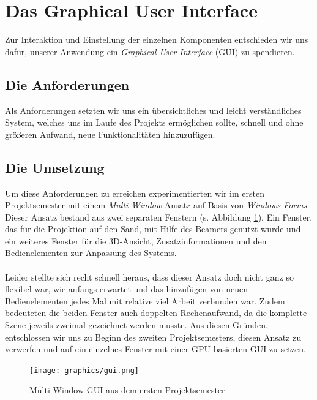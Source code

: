 \section{Das Graphical User Interface} \label{GUISec}
\begin{Spacing}{\mylinespace}

Zur Interaktion und Einstellung der einzelnen Komponenten entschieden wir uns dafür, unserer Anwendung ein \textit{Graphical User Interface} (GUI) zu spendieren. 

\subsection{Die Anforderungen}

Als Anforderungen setzten wir uns ein übersichtliches und leicht verständliches System, welches uns im Laufe des Projekts ermöglichen sollte, schnell und ohne größeren Aufwand, neue Funktionalitäten hinzuzufügen.  

\subsection{Die Umsetzung}

Um diese Anforderungen zu erreichen experimentierten wir im ersten Projektsemester mit einem \textit{Multi-Window} Ansatz auf Basis von \textit{Windows Forms}. Dieser Ansatz bestand aus zwei separaten Fenstern (s. Abbildung \ref{fig:GUIOld}). Ein Fenster, das für die Projektion auf den Sand, mit Hilfe des Beamers genutzt wurde und ein weiteres Fenster für die 3D-Ansicht, Zusatzinformationen und den Bedienelementen zur Anpassung des Systems.
\\\\
Leider stellte sich recht schnell heraus, dass dieser Ansatz doch nicht ganz so flexibel war, wie anfangs erwartet und das hinzufügen von neuen Bedienelementen jedes Mal mit relative viel Arbeit verbunden war. Zudem bedeuteten die beiden Fenster auch doppelten Rechenaufwand, da die komplette Szene jeweils zweimal gezeichnet werden musste. Aus diesen Gründen, entschlossen wir uns zu Beginn des zweiten Projektsemesters, diesen Ansatz zu verwerfen und auf ein einzelnes Fenster mit einer GPU-basierten GUI zu setzen.

\begin{figure}[h!]
	\centering
	\vspace*{30px}
	\texttt{[image: graphics/gui.png]}	
	\caption{Multi-Window GUI aus dem ersten Projektsemester.}
	\label{fig:GUIOld}
\end{figure}


\end{Spacing}
